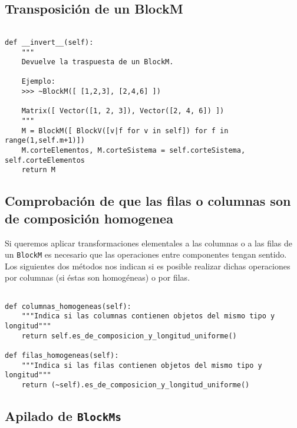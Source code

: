 \documentclass[11pt]{report}
\begin{document}
\subsection{Transposición de un BlockM}
\label{sec:org93829a8}

\begin{verbatim}

def __invert__(self):
    """
    Devuelve la traspuesta de un BlockM.
    
    Ejemplo:
    >>> ~BlockM([ [1,2,3], [2,4,6] ])
    
    Matrix([ Vector([1, 2, 3]), Vector([2, 4, 6]) ])
    """
    M = BlockM([ BlockV([v|f for v in self]) for f in range(1,self.m+1)])
    M.corteElementos, M.corteSistema = self.corteSistema, self.corteElementos
    return M

\end{verbatim}

\subsection{Comprobación de que las filas o columnas son de composición homogenea}
\label{sec:org53c0285}

Si queremos aplicar transformaciones elementales a las columnas o a
las filas de un \texttt{BlockM} es necesario que las operaciones entre
componentes tengan sentido. Los siguientes dos métodos nos indican si
es posible realizar dichas operaciones por columnas (si éstas son
homogéneas) o por filas.
\begin{verbatim}

def columnas_homogeneas(self):
    """Indica si las columnas contienen objetos del mismo tipo y longitud"""
    return self.es_de_composicion_y_longitud_uniforme()

def filas_homogeneas(self):
    """Indica si las filas contienen objetos del mismo tipo y longitud"""
    return (~self).es_de_composicion_y_longitud_uniforme()

\end{verbatim}

\subsection{Apilado de \texttt{BlockMs}}
\label{sec:org375d026}
\end{document}
